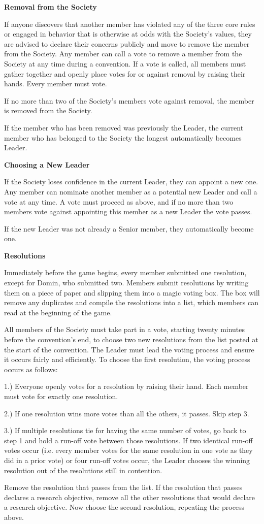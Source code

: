 \documentclass[green]{Sel}
\begin{document}
\name{\gVoting{}}
\textbf{Removal from the Society}

If anyone discovers that another member has violated any of the three core rules or engaged in behavior that is otherwise at odds with the Society's values, they are advised to declare their concerns publicly and move to remove the member from the Society. Any member can call a vote to remove a member from the Society at any time during a convention. If a vote is called, all members must gather together and openly place votes for or against removal by raising their hands. Every member must vote.

If no more than two of the Society's members vote against removal, the member is removed from the Society.

If the member who has been removed was previously the Leader, the current member who has belonged to the Society the longest automatically becomes Leader.

\textbf{Choosing a New Leader}

If the Society loses confidence in the current Leader, they can appoint a new one. Any member can nominate another member as a potential new Leader and call a vote at any time. A vote must proceed as above, and if no more than two members vote against appointing this member as a new Leader the vote passes.

If the new Leader was not already a Senior member, they automatically become one.

\textbf{Resolutions}

Immediately before the game begins, every member submitted one resolution, except for Domin, who submitted two. Members submit resolutions by writing them on a piece of paper and slipping them into a magic voting box. The box will remove any duplicates and compile the resolutions into a list, which members can read at the beginning of the game.

All members of the Society must take part in a vote, starting twenty minutes before the convention's end, to choose two new resolutions from the list posted at the start of the convention. The Leader must lead the voting process and ensure it occurs fairly and efficiently. To choose the first resolution, the voting process occurs as follows:

1.) Everyone openly votes for a resolution by raising their hand. Each member must vote for exactly one resolution.

2.) If one resolution wins more votes than all the others, it passes. Skip step 3.

3.) If multiple resolutions tie for having the same number of votes, go back to step 1 and hold a run-off vote between those resolutions. If two identical run-off votes occur (i.e. every member votes for the same resolution in one vote as they did in a prior vote) or four run-off votes occur, the Leader chooses the winning resolution out of the resolutions still in contention.

Remove the resolution that passes from the list. If the resolution that passes declares a research objective, remove all the other resolutions that would declare a research objective. Now choose the second resolution, repeating the process above.
\end{document}
